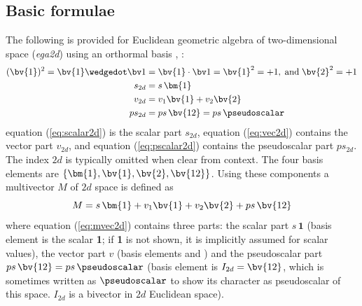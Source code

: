 \subsection{Basic formulae}
\label{basic_formulae}

The following is provided for Euclidean geometric algebra of two-dimensional space
(\emph{ega2d}) using an orthormal basis , :
\begin{subequations}
    \begin{align}
        (\bv{1})^2 = \bv{1} \wedgedot \bv1 & = \bv{1} \cdot \bv1 = \bv{1}^2 = +1,
        \;\text{and}\; \bv{2}^2 = +1 \nonumber\\
        s_{2d} & = s \, \bm{1}
        \label{eq:scalar2d} \\
        v_{2d} & = v_1\bv{1} + v_2\bv{2} 
        \label{eq:vec2d} \\
        ps_{2d} & = ps \, \bv{12}  = ps \, \pseudoscalar
        \label{eq:pscalar2d}
    \end{align}
\end{subequations}
equation (\ref{eq:scalar2d}) is the scalar part $s_{2d}$, equation (\ref{eq:vec2d})
contains the vector part $v_{2d}$, and equation (\ref{eq:pscalar2d}) contains the
pseudoscalar part $ps_{2d}$. The index $2d$ is typically omitted when clear from context.
The four basis elements are $\{\bm{1}, \bv{1}, \bv{2}, \bv{12}\}$. Using these components
a multivector $M$ of $2d$ space is defined as
\begin{equation}
     M = s \, \bm{1} + v_1\bv{1} + v_2\bv{2} + ps \, \bv{12}
    \label{eq:mvec2d}   
\end{equation}
where equation (\ref{eq:mvec2d}) contains three parts: the scalar part $s \, \bm{1}$
(basis element is the scalar \textbf{1}; if \textbf{1} is not shown, it is implicitly
assumed for scalar values), the vector part $v$ (basis elements  and ) and the
pseudoscalar part $ps \, \bv{12} = ps \, \pseudoscalar$ (basis element is $I_{2d} =
\bv{12}$, which is sometimes written as $\pseudoscalar$ to show its character as
pseudoscalar of this space. $I_{2d}$ is a bivector in $2d$ Euclidean space). \\

